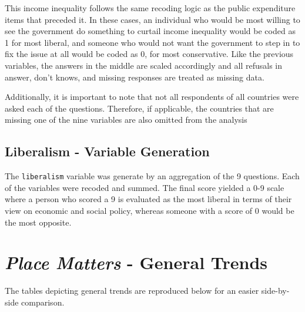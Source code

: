 \documentclass[12pt, titlepage]{article}
\newcommand\e{\emph}
\newcommand\txt{\texttt}
\begin{document}
\begin{appendices}
This income inequality follows the same recoding logic as the public expenditure items that preceded it. In these cases, an individual who would be most willing to see the government do something to curtail income inequality would be coded as 1 for most liberal, and someone who would not want the government to step in to fix the issue at all would be coded as 0, for most conservative. Like the previous variables, the answers in the middle are scaled accordingly and all refusals in answer, don't knows, and missing responses are treated as missing data.

Additionally, it is important to note that not all respondents of all countries were asked each of the questions. Therefore, if applicable, the countries that are missing one of the nine variables are also omitted from the analysis

\subsection{Liberalism - Variable Generation}

The \txt{liberalism} variable was generate by an aggregation of the 9 questions. Each of the variables were recoded and summed. The final score yielded a 0-9 scale where a person who scored a 9 is evaluated as the most liberal in terms of their view on economic and social policy, whereas someone with a score of 0 would be the most opposite.

\clearpage 

\section{\e{Place Matters} - General Trends}
\label{AppendixD}

The tables depicting general trends are reproduced below for an easier side-by-side comparison.



\end{appendices}
\end{document}
